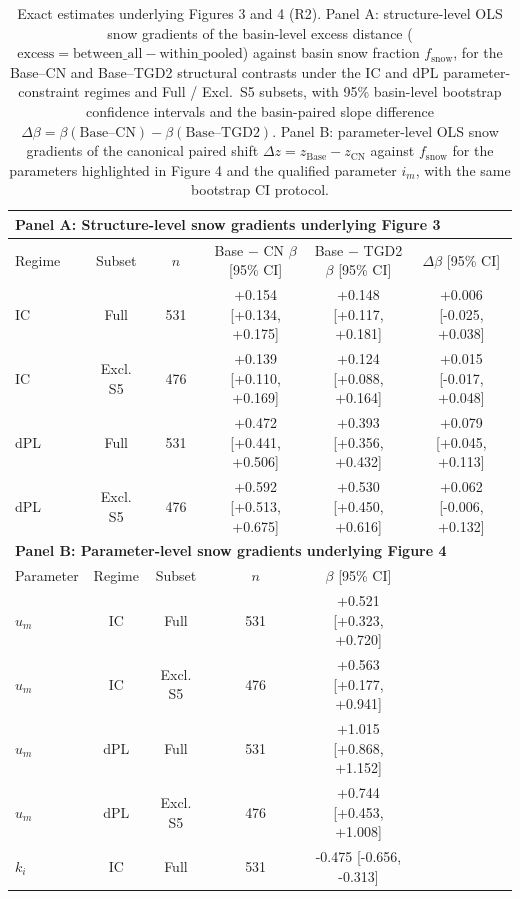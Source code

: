 \begin{table}[t]
\centering
\caption{Exact estimates underlying Figures 3 and 4 (R2). Panel A: structure-level OLS snow gradients of the basin-level excess distance ($\mathrm{excess} = \mathrm{between\_all} - \mathrm{within\_pooled}$) against basin snow fraction $f_{\mathrm{snow}}$, for the Base--CN and Base--TGD2 structural contrasts under the IC and dPL parameter-constraint regimes and Full / Excl.\ S5 subsets, with 95\% basin-level bootstrap confidence intervals and the basin-paired slope difference $\Delta\beta = \beta(\mathrm{Base\text{--}CN}) - \beta(\mathrm{Base\text{--}TGD2})$. Panel B: parameter-level OLS snow gradients of the canonical paired shift $\Delta z = z_{\mathrm{Base}} - z_{\mathrm{CN}}$ against $f_{\mathrm{snow}}$ for the parameters highlighted in Figure 4 and the qualified parameter $i_m$, with the same bootstrap CI protocol.}
\label{tab:tables4_exact_estimates_f3_f4}
\begin{threeparttable}
\begin{tabular}{lccccc}
\toprule
\multicolumn{6}{l}{\textbf{Panel A: Structure-level snow gradients underlying Figure 3}} \\
\midrule
Regime & Subset & $n$ & Base $-$ CN $\beta$ [95\% CI] & Base $-$ TGD2 $\beta$ [95\% CI] & $\Delta\beta$ [95\% CI] \\
\midrule
IC & Full & 531 & +0.154 [+0.134, +0.175] & +0.148 [+0.117, +0.181] & +0.006 [-0.025, +0.038] \\
IC & Excl. S5 & 476 & +0.139 [+0.110, +0.169] & +0.124 [+0.088, +0.164] & +0.015 [-0.017, +0.048] \\
dPL & Full & 531 & +0.472 [+0.441, +0.506] & +0.393 [+0.356, +0.432] & +0.079 [+0.045, +0.113] \\
dPL & Excl. S5 & 476 & +0.592 [+0.513, +0.675] & +0.530 [+0.450, +0.616] & +0.062 [-0.006, +0.132] \\
\midrule
\multicolumn{6}{l}{\textbf{Panel B: Parameter-level snow gradients underlying Figure 4}} \\
\midrule
Parameter & Regime & Subset & $n$ & $\beta$ [95\% CI] & \\
\midrule
$u_m$ & IC & Full & 531 & +0.521 [+0.323, +0.720] &  \\
$u_m$ & IC & Excl. S5 & 476 & +0.563 [+0.177, +0.941] &  \\
$u_m$ & dPL & Full & 531 & +1.015 [+0.868, +1.152] &  \\
$u_m$ & dPL & Excl. S5 & 476 & +0.744 [+0.453, +1.008] &  \\
$k_i$ & IC & Full & 531 & -0.475 [-0.656, -0.313] &  \\

\end{tabular}
\end{threeparttable}
\end{table}
